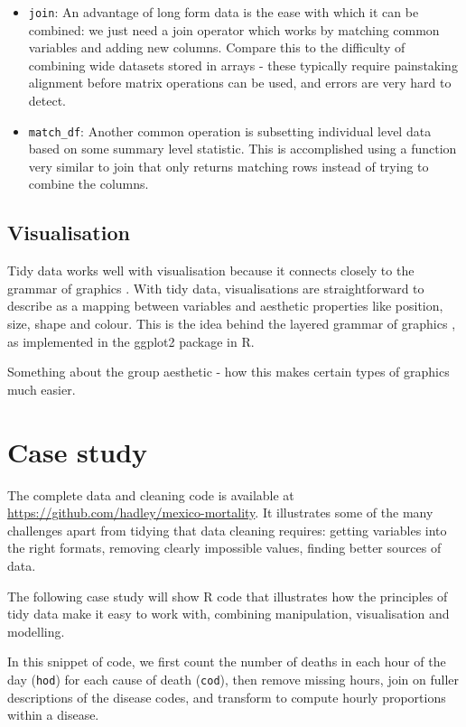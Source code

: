 \documentclass[oneside]{article}
\begin{document}
\begin{itemize}

\item {\tt join}: An advantage of long form data is the ease with which it can be combined: we just need a join operator which works by matching common variables and adding new columns. Compare this to the difficulty of combining wide datasets stored in arrays - these typically require painstaking alignment before matrix operations can be used, and errors are very hard to detect. 

\item {\tt match\_df}: Another common operation is subsetting individual level data based on some summary level statistic. This is accomplished using a function very similar to join that only returns matching rows instead of trying to combine the columns.

\end{itemize}

\subsection{Visualisation}

Tidy data works well with visualisation because it connects closely to the grammar of graphics \citep{wilkinson:2006}. With tidy data, visualisations are straightforward to describe as a mapping between variables and aesthetic properties like position, size, shape and colour. This is the idea behind the layered grammar of graphics \citep{wickham:2007d}, as implemented in the ggplot2 package in R.

Something about the group aesthetic - how this makes certain types of graphics much easier.

\section{Case study} 

The complete data and cleaning code is available at \url{https://github.com/hadley/mexico-mortality}.  It illustrates some of the many challenges apart from tidying that data cleaning requires: getting variables into the right formats, removing clearly impossible values, finding better sources of data. 

The following case study will show R code that illustrates how the principles of tidy data make it easy to work with, combining manipulation, visualisation and modelling.

In this snippet of code, we first count the number of deaths in each hour of the day ({\tt hod}) for each cause of death ({\tt cod}), then remove missing hours, join on fuller descriptions of the disease codes, and transform to compute hourly proportions within a disease.
\end{document}
